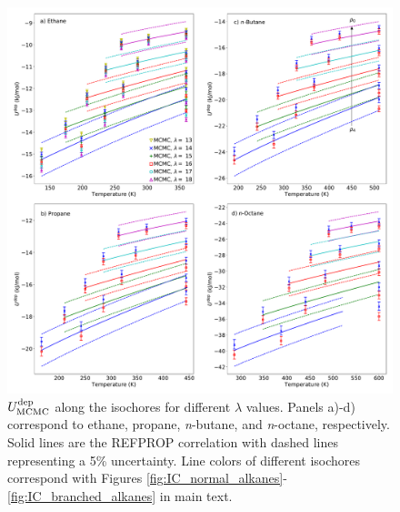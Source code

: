 \documentclass[journal=jctc,manuscript=article]{achemso}
\begin{document}

\begin{figure}[p!]
	\centering
	\includegraphics[width=6.4in]{MCMC_Mie_UIC_alkanes}
	\caption{$U^{\rm dep}_{\rm MCMC}$ along the isochores for different $\lambda$ values. Panels a)-d) correspond to ethane, propane, \textit{n}-butane, and \textit{n}-octane, respectively. Solid lines are the REFPROP correlation with dashed lines representing a 5\% uncertainty. Line colors of different isochores correspond with Figures \ref{fig:IC_normal_alkanes}-\ref{fig:IC_branched_alkanes} in main text.}
	\label{fig:MCMC_Mie_UIC_alkanes}
\end{figure} 

\newpage



\end{document}

